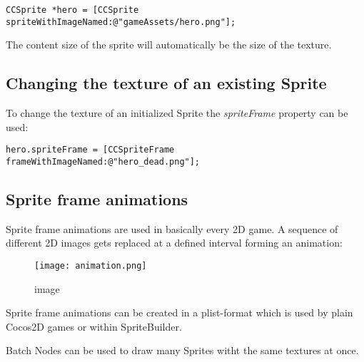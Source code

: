 \begin{verbatim}
CCSprite *hero = [CCSprite spriteWithImageNamed:@"gameAssets/hero.png"];
\end{verbatim}

The content size of the sprite will automatically be the size of the
texture.

\subsection{Changing the texture of an existing
Sprite}\label{changing-the-texture-of-an-existing-sprite}

To change the texture of an initialized Sprite the \emph{spriteFrame}
property can be used:

\begin{verbatim}
hero.spriteFrame = [CCSpriteFrame frameWithImageNamed:@"hero_dead.png"];
\end{verbatim}

\subsection{Sprite frame animations}\label{sprite-frame-animations}

Sprite frame animations are used in basically every 2D game. A sequence
of different 2D images gets replaced at a defined interval forming an
animation:

\begin{figure}[htbp]
\centering
\texttt{[image: animation.png]}
\caption{image}
\end{figure}

Sprite frame animations can be created in a plist-format which is used
by plain Cocos2D games or within SpriteBuilder.


\begin{lamp}[frametitle={Optimizing Performance with Batch Nodes}]
Batch Nodes can be used to draw many Sprites witht the same textures at once.
\end{lamp}